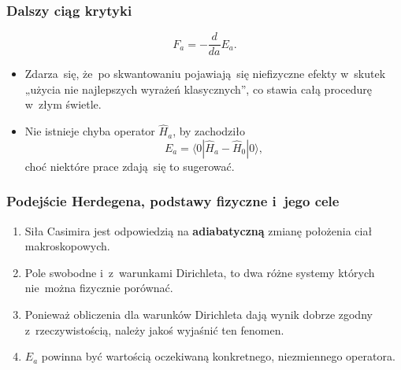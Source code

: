 \documentclass[10pt,t]{beamer}
\begin{document}
\begin{frame}
  \frametitle{Dalszy ciąg krytyki}


  \begin{equation}
    \label{eq:Efekt-Casimira-07}
    F_{ a } = -\frac{ d }{ da } E_{ a }.
  \end{equation}



  \begin{itemize}
    \RaggedRight

  \item Zdarza~się, że~po skwantowaniu pojawiają~się niefizyczne
    efekty w~skutek „użycia nie najlepszych wyrażeń klasycznych”,
    co stawia całą procedurę w~złym świetle.

  \item Nie istnieje chyba operator $\widehat{ H }_{ a }$, by
    zachodziło
    \begin{equation}
      \label{eq:Efekt-Casimira-08}
      E_{ a } = \langle 0 | \widehat{ H }_{ a } - \widehat{ H }_{ 0 } | 0 \rangle,
    \end{equation}
    choć niektóre prace zdają~się to sugerować.

  \end{itemize}

\end{frame}





\begin{frame}
  \frametitle{Podejście Herdegena, podstawy fizyczne i~jego cele}


  \begin{enumerate}
    \RaggedRight

  \item Siła Casimira jest odpowiedzią na \textbf{adiabatyczną} zmianę
    położenia ciał makroskopowych.

  \item Pole swobodne i~z~warunkami Dirichleta, to dwa różne systemy
    których nie~można fizycznie porównać.

  \item Ponieważ obliczenia dla warunków Dirichleta dają wynik dobrze
    zgodny z~rzeczywistością, należy jakoś wyjaśnić ten fenomen.

  \item $E_{ a }$ powinna być wartością oczekiwaną konkretnego,
    niezmiennego operatora.

  \end{enumerate}

\end{frame}
\end{document}
